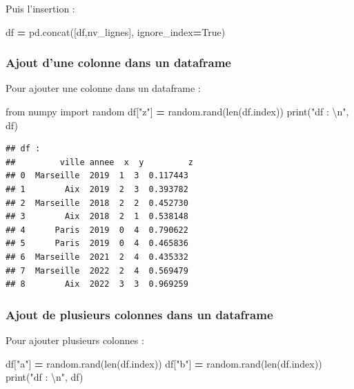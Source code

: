 \documentclass[
  12pt,
]{book}
\newenvironment{Shaded}{\begin{snugshade}}{\end{snugshade}}
\newcommand{\BuiltInTok}[1]{#1}
\newcommand{\CharTok}[1]{\textcolor[rgb]{0.31,0.60,0.02}{#1}}
\newcommand{\ImportTok}[1]{#1}
\newcommand{\NormalTok}[1]{#1}
\newcommand{\OperatorTok}[1]{\textcolor[rgb]{0.81,0.36,0.00}{\textbf{#1}}}
\newcommand{\StringTok}[1]{\textcolor[rgb]{0.31,0.60,0.02}{#1}}
\newcommand{\VariableTok}[1]{\textcolor[rgb]{0.00,0.00,0.00}{#1}}
\numberwithin{equation}{section}
\numberwithin{countremarque}{section}
\begin{document}
Puis l'insertion :

\begin{Shaded}
\begin{Highlighting}[]
\NormalTok{df }\OperatorTok{=}\NormalTok{ pd.concat([df,nv\_lignes], ignore\_index}\OperatorTok{=}\VariableTok{True}\NormalTok{)}
\end{Highlighting}
\end{Shaded}

\subsubsection{Ajout d'une colonne dans un dataframe}\label{ajout-dune-colonne-dans-un-dataframe}

Pour ajouter une colonne dans un dataframe :

\begin{Shaded}
\begin{Highlighting}[]
\ImportTok{from}\NormalTok{ numpy }\ImportTok{import}\NormalTok{ random}
\NormalTok{df[}\StringTok{"z"}\NormalTok{] }\OperatorTok{=}\NormalTok{ random.rand(}\BuiltInTok{len}\NormalTok{(df.index))}
\BuiltInTok{print}\NormalTok{(}\StringTok{"df : }\CharTok{\textbackslash{}n}\StringTok{"}\NormalTok{, df)}
\end{Highlighting}
\end{Shaded}

\begin{lstlisting}
## df : 
##         ville annee  x  y         z
## 0  Marseille  2019  1  3  0.117443
## 1        Aix  2019  2  3  0.393782
## 2  Marseille  2018  2  2  0.452730
## 3        Aix  2018  2  1  0.538148
## 4      Paris  2019  0  4  0.790622
## 5      Paris  2019  0  4  0.465836
## 6  Marseille  2021  2  4  0.435332
## 7  Marseille  2022  2  4  0.569479
## 8        Aix  2022  3  3  0.969259
\end{lstlisting}

\subsubsection{Ajout de plusieurs colonnes dans un dataframe}\label{ajout-de-plusieurs-colonnes-dans-un-dataframe}

Pour ajouter plusieurs colonnes :

\begin{Shaded}
\begin{Highlighting}[]
\NormalTok{df[}\StringTok{"a"}\NormalTok{] }\OperatorTok{=}\NormalTok{ random.rand(}\BuiltInTok{len}\NormalTok{(df.index))}
\NormalTok{df[}\StringTok{"b"}\NormalTok{] }\OperatorTok{=}\NormalTok{ random.rand(}\BuiltInTok{len}\NormalTok{(df.index))}
\BuiltInTok{print}\NormalTok{(}\StringTok{"df : }\CharTok{\textbackslash{}n}\StringTok{"}\NormalTok{, df)}
\end{Highlighting}
\end{Shaded}
\end{document}
